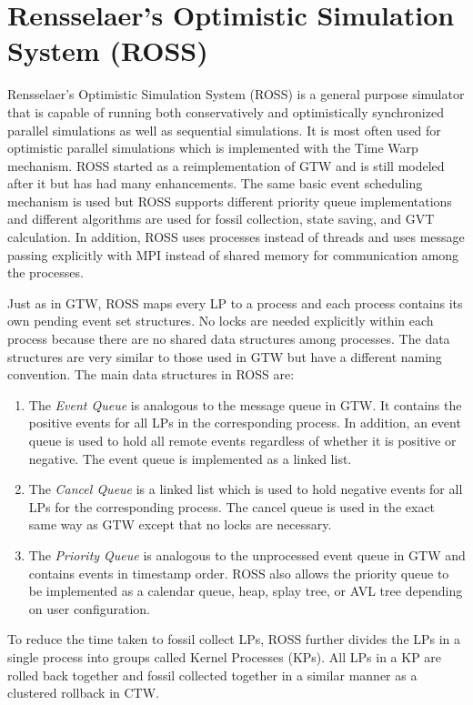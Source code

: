 \documentclass[11pt]{book}
\begin{document}
\section{Rensselaer's Optimistic Simulation System (ROSS)}

Rensselaer's Optimistic Simulation System \cite{carothers-00} (ROSS) is a general purpose simulator
that is capable of running both conservatively and optimistically synchronized parallel simulations
as well as sequential simulations.  It is most often used for optimistic parallel simulations which
is implemented with the Time Warp mechanism.  ROSS started as a reimplementation of GTW and is still
modeled after it but has had many enhancements.  The same basic event scheduling mechanism is used
but ROSS supports different priority queue implementations and different algorithms are used for
fossil collection, state saving, and GVT calculation.  In addition, ROSS uses processes instead of
threads and uses message passing explicitly with MPI instead of shared memory for communication
among the processes.

Just as in GTW, ROSS maps every LP to a process and each process contains its own pending event set
structures.  No locks are needed explicitly within each process because there are no shared data
structures among processes.  The data structures are very similar to those used in GTW but have a
different naming convention.  The main data structures in ROSS are:

\begin{enumerate}
\item The \emph{Event Queue} is analogous to the message queue in GTW.  It contains the positive
  events for all LPs in the corresponding process.  In addition, an event queue is used to hold all
  remote events regardless of whether it is positive or negative.  The event queue is implemented as
  a linked list.
\item The \emph{Cancel Queue} is a linked list which is used to hold negative events for all LPs for
  the corresponding process.  The cancel queue is used in the exact same way as GTW except that no
  locks are necessary.
\item The \emph{Priority Queue} is analogous to the unprocessed event queue in GTW and contains
  events in timestamp order.  ROSS also allows the priority queue to be implemented as a calendar
  queue, heap, splay tree, or AVL tree depending on user configuration.
\end{enumerate}

To reduce the time taken to fossil collect LPs, ROSS further divides the LPs in a single process
into groups called Kernel Processes (KPs).  All LPs in a KP are rolled back together and fossil
collected together in a similar manner as a clustered rollback in CTW.
\end{document}
